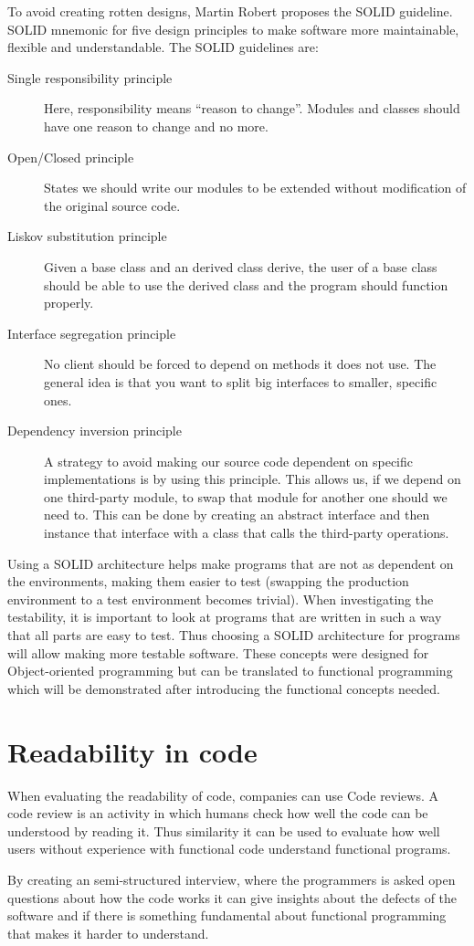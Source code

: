 To avoid creating rotten designs, Martin Robert proposes the SOLID guideline.
SOLID mnemonic for five design principles to make software more maintainable,
flexible and understandable. The SOLID guidelines are:

\begin{description}
    \item [Single responsibility principle] Here, responsibility means ``reason
        to change''. Modules and classes should have one reason to change and no
        more.
    \item [Open/Closed principle] States we should write our modules to be
        extended without modification of the original source code.
    \item [Liskov substitution principle] Given a base class and an derived
        class derive, the user of a base class should be able to use the derived
        class and the program should function properly.
    \item [Interface segregation principle] No client should be forced to depend
        on methods it does not use. The general idea is that you want to split
        big interfaces to smaller, specific ones.
    \item [Dependency inversion principle] A strategy to avoid making our source
        code dependent on specific implementations is by using this principle.
        This allows us, if we depend on one third-party module, to swap that
        module for another one should we need to. This can be done by creating
        an abstract interface and then instance that interface with a class that
        calls the third-party operations.~\cite{martinrobert}
\end{description}

Using a SOLID architecture helps make programs that are not as dependent on the
environments, making them easier to test (swapping the production environment to
a test environment becomes trivial). When investigating the testability, it is
important to look at programs that are written in such a way that all parts are
easy to test. Thus choosing a SOLID architecture for  programs will allow making
more testable software. These concepts were designed for Object-oriented
programming but can be translated to functional programming which will be
demonstrated after introducing the functional concepts needed.


\section{Readability in code}

When evaluating the readability of code, companies can use Code reviews. A code
review is an activity in which humans check how well the code can be understood
by reading it. Thus similarity it can be used to evaluate how well users without
experience with functional code understand functional programs. 

By creating an semi-structured interview, where the programmers is asked open
questions about how the code works it can give insights about the defects of the
software and if there is something fundamental about functional programming that
makes it harder to understand.


